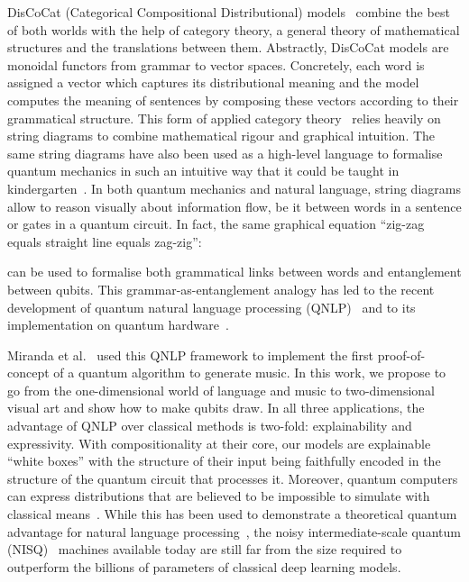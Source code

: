 DisCoCat (Categorical Compositional Distributional) models~\cite{ClarkEtAl10} combine the best of both worlds with the help of category theory, a general theory of mathematical structures and the translations between them.
Abstractly, DisCoCat models are monoidal functors from grammar to vector spaces.
Concretely, each word is assigned a vector which captures its distributional meaning and the model computes the meaning of sentences by composing these vectors according to their grammatical structure.
This form of applied category theory~\cite{Bradley18} relies heavily on string diagrams to combine mathematical rigour and graphical intuition.
The same string diagrams have also been used as a high-level language to formalise quantum mechanics in such an intuitive way that it could be taught in kindergarten~\cite{Coecke05}.
In both quantum mechanics and natural language, string diagrams allow to reason visually about information flow, be it between words in a sentence or gates in a quantum circuit.
In fact, the same graphical equation ``zig-zag equals straight line equals zag-zig'':
\begin{center}

\end{center}
can be used to formalise both grammatical links between words and entanglement between qubits.
This grammar-as-entanglement analogy has led to the recent development of quantum natural language processing (QNLP)~\cite{MeichanetzidisEtAl20a,CoeckeEtAl20,CoeckeEtAl22,Toumi22} and to its implementation on quantum hardware~\cite{LorenzEtAl21,MeichanetzidisEtAl23}.

Miranda et al.~\cite{MirandaEtAl21} used this QNLP framework to implement the first proof-of-concept of a quantum algorithm to generate music.
In this work, we propose to go from the one-dimensional world of language and music to two-dimensional visual art and show how to make qubits draw.
In all three applications, the advantage of QNLP over classical methods is two-fold: explainability and expressivity.
With compositionality at their core, our models are explainable ``white boxes'' with the structure of their input being faithfully encoded in the structure of the quantum circuit that processes it.
Moreover, quantum computers can express distributions that are believed to be impossible to simulate with classical means~\cite{Aaronson15}.
While this has been used to demonstrate a theoretical quantum advantage for natural language processing~\cite{ZengCoecke16,WiebeEtAl19}, the noisy intermediate-scale quantum (NISQ)~\cite{Preskill18} machines available today are still far from the size required to outperform the billions of parameters of classical deep learning models.

